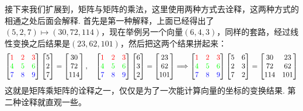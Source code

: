 \documentclass[main.tex]{subfiles}
\begin{document}
接下来我们扩展到，矩阵与矩阵的乘法，这里使用两种方式去诠释，这两种方式的相通之处后面会解释. 首先是第一种解释，上面已经得出了\((5,2,7) \mapsto (30,72,114)\)，现在举例另一个向量\((6,4,3)\)，同样的套路，经过线性变换之后结果是\((23,62,101)\)，然后把这两个结果拼起来：
\[
    \begin{bmatrix} 
        {\color{red} 1} & {\color{red} 2} & {\color{red} 3} \\ 
        {\color{green} 4} & {\color{green} 5} & {\color{green} 6} \\ 
        {\color{blue} 7} & {\color{blue} 8} & {\color{blue} 9} 
    \end{bmatrix} 
    \begin{bmatrix} 5 \\ 2 \\ 7 \end{bmatrix} = \begin{bmatrix} 30 \\ 72 \\ 114 \end{bmatrix}
    ,\quad 
    \begin{bmatrix} 
        {\color{red} 1} & {\color{red} 2} & {\color{red} 3} \\ 
        {\color{green} 4} & {\color{green} 5} & {\color{green} 6} \\ 
        {\color{blue} 7} & {\color{blue} 8} & {\color{blue} 9} 
    \end{bmatrix} 
    \begin{bmatrix} 6 \\ 3 \\ 2 \end{bmatrix} = \begin{bmatrix} 23 \\ 62 \\ 101 \end{bmatrix}
    \Longrightarrow
    \begin{bmatrix} 
        {\color{red} 1} & {\color{red} 2} & {\color{red} 3} \\ 
        {\color{green} 4} & {\color{green} 5} & {\color{green} 6} \\ 
        {\color{blue} 7} & {\color{blue} 8} & {\color{blue} 9} 
    \end{bmatrix} 
    \begin{bmatrix} 5 & 6 \\ 2 & 3 \\ 7 & 2 \end{bmatrix} = \begin{bmatrix} 30 & 23 \\ 72 & 62 \\ 114 & 101 \end{bmatrix}
\]
这就是矩阵乘矩阵的诠释之一，仅仅是为了一次能计算向量的坐标的变换结果. 第二种诠释就直观一些。
\end{document}
